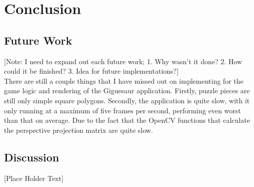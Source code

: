 \documentclass{article}
\begin{document}

\section{Conclusion}

\subsection{Future Work}
[Note: I need to expand out each future work; 1. Why wasn't it done? 2. How
  could it be finished? 3. Idea for future implementations?]\\

There are still a couple things that I have missed out on implementing for the
game logic and rendering of the Giguesaur application. Firstly, puzzle pieces
are still only simple square polygons. Secondly, the application is quite slow,
with it only running at a maximum of five frames per second, performing even
worst than that on average. Due to the fact that the OpenCV functions that
calculate the perspective projection matrix are quite slow.

\subsection{Discussion}
[Place Holder Text]


\clearpage



\end{document}
